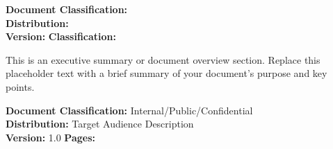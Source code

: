 \documentclass[a4paper,11pt]{article}
\begin{document}
{{        \coverauthor{\AuthorPlaceholder}
        
        \vspace{0.2in}
        
        \begin{center}
        \color{accent}
        \fontsize{16}{20}\selectfont\bfseries\sffamily
        \DatePlaceholder
        \end{center}
        
        \vfill
        
        \begin{center}
        \end{center}
        
        \vspace{0.3in}
        
        \begin{classificationbox}
        \centering
        \footnotesize\sffamily
        \textbf{Document Classification:} \ClassificationPlaceholder\\
        \textbf{Distribution:} \DistributionPlaceholder\\
        \textbf{Version:} \VersionPlaceholder \quad 
        \textbf{Classification:} \ClassificationLevelPlaceholder
        \end{classificationbox}
    }{}
    
    \newpage
}

\maketitle
\thispagestyle{empty}

\begin{infobox}
This is an executive summary or document overview section. Replace this placeholder text with a brief summary of your document's purpose and key points.
\end{infobox}

\vfill
\begin{center}
\color{textgray}\footnotesize\sffamily
\textbf{Document Classification:} Internal/Public/Confidential\\
\textbf{Distribution:} Target Audience Description\\
\textbf{Version:} 1.0 \quad \textbf{Pages:} \pageref{LastPage}
\end{center}
\end{document}
